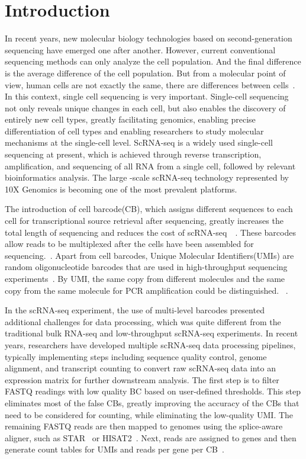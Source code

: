 \documentclass[runningheads]{llncs}
\begin{document}
\section{Introduction}
In recent years, new molecular biology technologies based on second-generation sequencing have emerged one after another.
However, current conventional sequencing methods can only analyze the cell population.
And the final difference is the average difference of the cell population.
But from a molecular point of view, human cells are not exactly the same, there are differences between cells~\cite{Papalexi2018SinglecellRS}.
In this context, single cell sequencing is very important.
Single-cell sequencing not only reveals unique changes in each cell, but also enables the discovery of entirely new cell types, greatly facilitating genomics, enabling precise differentiation of cell types and enabling researchers to study molecular mechanisms at the single-cell level.
ScRNA-seq is a widely used single-cell sequencing at present, which is achieved through reverse transcription, amplification, and sequencing of all RNA from a single cell, followed by relevant bioinformatics analysis. 
The large
         -scale 
                scRNA-seq technology represented by 10X Genomics is becoming one of the most prevalent platforms.

The introduction of cell barcode(CB), which assigns different sequences to each cell for transcriptional source retrieval after sequencing, greatly increases the total length of sequencing and reduces the cost of scRNA-seq~\cite{Macosko2015HighlyPG}~\cite{Klein2015DropletBF}.
These barcodes allow reads to be multiplexed after the cells have been assembled for sequencing.~\cite{tian2018scPipe}.
Apart from cell barcodes, Unique Molecular Identifiers(UMIs) are random oligonucleotide barcodes that are used in high-throughput sequencing experiments\cite{Kivioja2012Counting}~\cite{camara2017Methods}.
By UMI, the same copy from different molecules and the same copy from the same molecule for PCR amplification could be distinguished. ~\cite{smith2017UMI}.

In the scRNA-seq experiment, the use of multi-level barcodes presented additional challenges for data processing, which was quite different from the traditional bulk RNA-seq and low-throughput scRNA-seq experiments.
In recent years, researchers have developed multiple scRNA-seq data processing pipelines, typically implementing steps including sequence quality control, genome alignment, and transcript counting to convert raw scRNA-seq data into an expression matrix for further downstream analysis.
The first step is to filter FASTQ readings with low quality BC based on user-defined thresholds.
This step eliminates most of the false CBs, greatly improving the accuracy of the CBs that need to be considered for counting, while eliminating the low-quality UMI.
The remaining FASTQ reads are then mapped to genomes using the splice-aware aligner, such as STAR~\cite{dobin2012RNA} or HISAT2~\cite{kim2015hisat}.
Next, reads are assigned to genes and then generate count tables for UMIs and reads per gene per CB~\cite{swati0zUMIs}.
\end{document}
